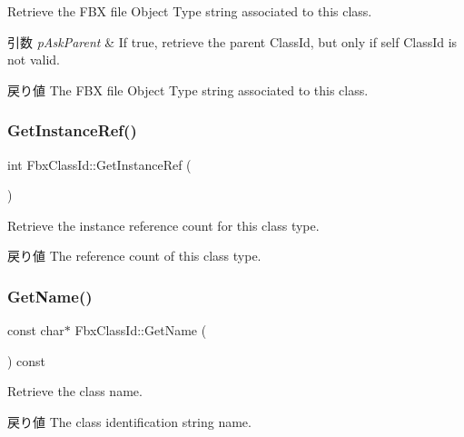 Retrieve the F\+BX file Object Type string associated to this class. 
\begin{DoxyParams}{引数}
{\em p\+Ask\+Parent} & If {\ttfamily true}, retrieve the parent Class\+Id, but only if self Class\+Id is not valid. \\
\hline
\end{DoxyParams}
\begin{DoxyReturn}{戻り値}
The F\+BX file Object Type string associated to this class. 
\end{DoxyReturn}
\mbox{\label{class_fbx_class_id_a8650ac5fe79b1241e0c65b32d67d1fcc}} 
\subsubsection{\texorpdfstring{Get\+Instance\+Ref()}{GetInstanceRef()}}
{\footnotesize\ttfamily int Fbx\+Class\+Id\+::\+Get\+Instance\+Ref (\begin{DoxyParamCaption}{ }\end{DoxyParamCaption})}

Retrieve the instance reference count for this class type. \begin{DoxyReturn}{戻り値}
The reference count of this class type. 
\end{DoxyReturn}
\mbox{\label{class_fbx_class_id_ad9ec390d9c134c57f76ccfcbe448b1c5}} 
\subsubsection{\texorpdfstring{Get\+Name()}{GetName()}}
{\footnotesize\ttfamily const char$\ast$ Fbx\+Class\+Id\+::\+Get\+Name (\begin{DoxyParamCaption}{ }\end{DoxyParamCaption}) const}

Retrieve the class name. \begin{DoxyReturn}{戻り値}
The class identification string name. 
\end{DoxyReturn}
\mbox{\label{class_fbx_class_id_a31ab0fd2220388a26bbc10b0ed7aef67}} 
